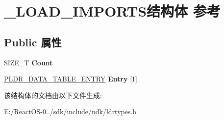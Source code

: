 \hypertarget{struct___l_o_a_d___i_m_p_o_r_t_s}{}\section{\+\_\+\+L\+O\+A\+D\+\_\+\+I\+M\+P\+O\+R\+T\+S结构体 参考}
\label{struct___l_o_a_d___i_m_p_o_r_t_s}
\subsection*{Public 属性}
\begin{DoxyCompactItemize}
\item 
\mbox{\label{struct___l_o_a_d___i_m_p_o_r_t_s_aac9092cf43b964f4d9ad98abc53ee268}} 
S\+I\+Z\+E\+\_\+T {\bfseries Count}
\item 
\mbox{\label{struct___l_o_a_d___i_m_p_o_r_t_s_ae297ced9f9cce9c84ba7cea767438009}} 
\hyperlink{struct___l_d_r___d_a_t_a___t_a_b_l_e___e_n_t_r_y}{P\+L\+D\+R\+\_\+\+D\+A\+T\+A\+\_\+\+T\+A\+B\+L\+E\+\_\+\+E\+N\+T\+RY} {\bfseries Entry} \mbox{[}1\mbox{]}
\end{DoxyCompactItemize}


该结构体的文档由以下文件生成\+:\begin{DoxyCompactItemize}
\item 
E\+:/\+React\+O\+S-\/0../sdk/include/ndk/ldrtypes.\+h\end{DoxyCompactItemize}
